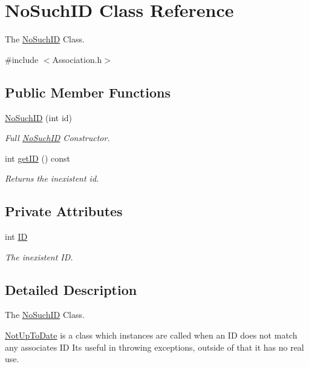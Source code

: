 \hypertarget{classNoSuchID}{}\section{No\+Such\+ID Class Reference}
\label{classNoSuchID}


The \hyperlink{classNoSuchID}{No\+Such\+ID} Class.  




{\ttfamily \#include $<$Association.\+h$>$}

\subsection*{Public Member Functions}
\begin{DoxyCompactItemize}
\item 
\hyperlink{classNoSuchID_a3b85ef775a99d9f93eabaa21ef29e950}{No\+Such\+ID} (int id)
\begin{DoxyCompactList}\small\item\em Full \hyperlink{classNoSuchID}{No\+Such\+ID} Constructor. \end{DoxyCompactList}\item 
int \hyperlink{classNoSuchID_a42be677d2a3bbf7c12feffeda0904bfa}{get\+ID} () const
\begin{DoxyCompactList}\small\item\em Returns the inexistent id. \end{DoxyCompactList}\end{DoxyCompactItemize}
\subsection*{Private Attributes}
\begin{DoxyCompactItemize}
\item 
int \hyperlink{classNoSuchID_a1b0c95e546b2147a298230f33d3dbeec}{ID}
\begin{DoxyCompactList}\small\item\em The inexistent ID. \end{DoxyCompactList}\end{DoxyCompactItemize}


\subsection{Detailed Description}
The \hyperlink{classNoSuchID}{No\+Such\+ID} Class. 

\hyperlink{classNotUpToDate}{Not\+Up\+To\+Date} is a class which instances are called when an ID does not match any associate\textquotesingle{}s ID Its useful in throwing exceptions, outside of that it has no real use. 

